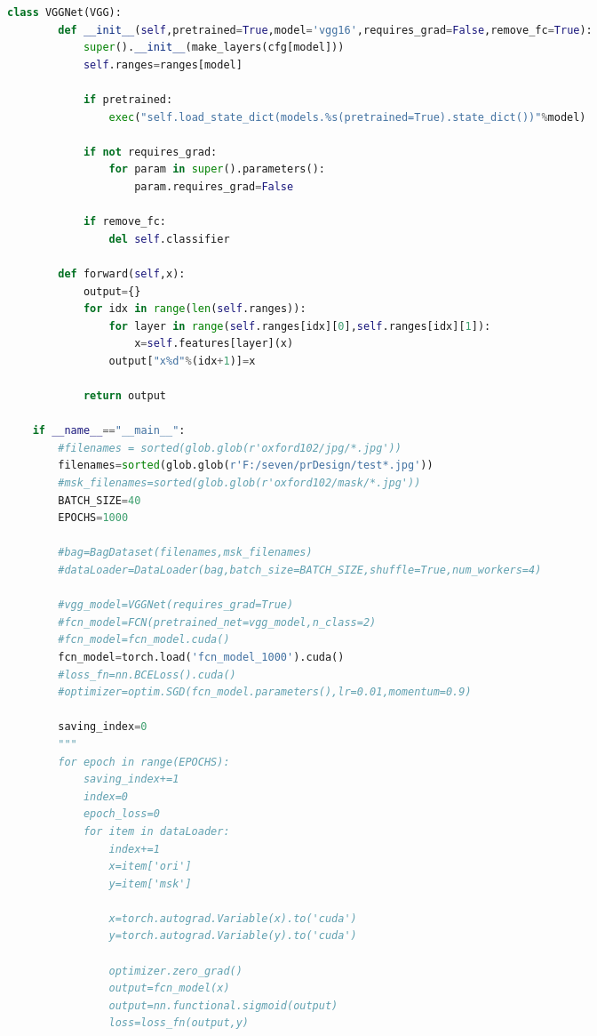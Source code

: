 \documentclass[supercite]{HustGraduPaper}
\begin{document}
\begin{sloppypar}
\begin{appendices}
\begin{spacing}{1.25}
\begin{lstlisting}[language=python]
    class VGGNet(VGG):
        def __init__(self,pretrained=True,model='vgg16',requires_grad=False,remove_fc=True):
            super().__init__(make_layers(cfg[model]))
            self.ranges=ranges[model]
    
            if pretrained:
                exec("self.load_state_dict(models.%s(pretrained=True).state_dict())"%model)
    
            if not requires_grad:
                for param in super().parameters():
                    param.requires_grad=False
    
            if remove_fc:
                del self.classifier
    
        def forward(self,x):
            output={}
            for idx in range(len(self.ranges)):
                for layer in range(self.ranges[idx][0],self.ranges[idx][1]):
                    x=self.features[layer](x)
                output["x%d"%(idx+1)]=x
    
            return output
    
    if __name__=="__main__":
        #filenames = sorted(glob.glob(r'oxford102/jpg/*.jpg'))
        filenames=sorted(glob.glob(r'F:/seven/prDesign/test*.jpg'))
        #msk_filenames=sorted(glob.glob(r'oxford102/mask/*.jpg'))
        BATCH_SIZE=40
        EPOCHS=1000
    
        #bag=BagDataset(filenames,msk_filenames)
        #dataLoader=DataLoader(bag,batch_size=BATCH_SIZE,shuffle=True,num_workers=4)
    
        #vgg_model=VGGNet(requires_grad=True)
        #fcn_model=FCN(pretrained_net=vgg_model,n_class=2)
        #fcn_model=fcn_model.cuda()
        fcn_model=torch.load('fcn_model_1000').cuda()
        #loss_fn=nn.BCELoss().cuda()
        #optimizer=optim.SGD(fcn_model.parameters(),lr=0.01,momentum=0.9)
    
        saving_index=0
        """
        for epoch in range(EPOCHS):
            saving_index+=1
            index=0
            epoch_loss=0
            for item in dataLoader:
                index+=1
                x=item['ori']
                y=item['msk']
    
                x=torch.autograd.Variable(x).to('cuda')
                y=torch.autograd.Variable(y).to('cuda')
    
                optimizer.zero_grad()
                output=fcn_model(x)
                output=nn.functional.sigmoid(output)
                loss=loss_fn(output,y)
                

\end{lstlisting}
\end{spacing}
\end{appendices}
\end{sloppypar}
\end{document}
